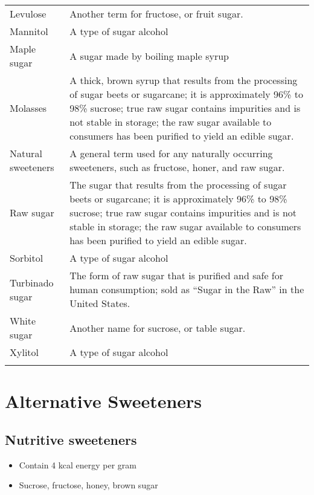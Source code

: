 \documentclass[title={Chapter 4}]{fdsn201notes}
\begin{document}
\begin{table}[H]
\begin{threeparttable}
\begin{tabular}{p{} p{}}
			Levulose & Another term for fructose, or fruit sugar.\\
			Mannitol & A type of sugar alcohol\\
			Maple sugar & A sugar made by boiling maple syrup\\
			Molasses & A thick, brown syrup that results from the processing of sugar beets or sugarcane; it is approximately 96\% to 98\% sucrose; true raw sugar contains impurities and is not stable in storage; the raw sugar available to consumers has been purified to yield an edible sugar.\\
			Natural sweeteners & A general term used for any naturally occurring sweeteners, such as fructose, honer, and raw sugar.\\
			Raw sugar & The sugar that results from the processing of sugar beets or sugarcane; it is approximately 96\% to 98\% sucrose; true raw sugar contains impurities and is not stable in storage; the raw sugar available to consumers has been purified to yield an edible sugar.\\
			Sorbitol & A type of sugar alcohol\\
			Turbinado sugar & The form of raw sugar that is purified and safe for human consumption; sold as ``Sugar in the Raw'' in the United States.\\
			White sugar & Another name for sucrose, or table sugar.\\
			Xylitol & A type of sugar alcohol\\
			\rowcolor{rowdarkgreen} & \\
		\end{tabular}
		\begin{tablenotes}
			\small
			\item
		\end{tablenotes}
	\end{threeparttable}
\end{table}

\section{Alternative Sweeteners}\label{sec:alternative-sweeteners}
\subsection{Nutritive sweeteners}\label{subsec:nutritive-sweeteners}
\begin{itemize}
	\item Contain 4 kcal energy per gram
	\item Sucrose, fructose, honey, brown sugar
\end{itemize}
\end{document}
